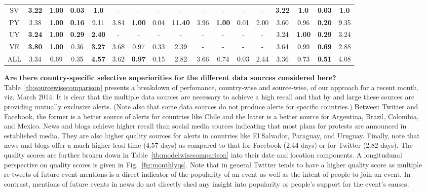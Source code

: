 \begin{table*}[tb!]
\begin{tabular}{|*{17}{c|}}
        SV &{\bf3.22}&{\bf1.00}&{\bf0.03}&{\bf1.0}&-&-&-&-&-&-&-&-&{\bf3.22}&{\bf1.0}&{\bf0.03}&{\bf1.0}\\
        PY &3.38&{\bf1.00}&{\bf0.16}&9.11&3.84&{\bf1.00}&0.04&{\bf11.40}&3.96&{\bf1.00}&0.01&2.00&3.60&0.96&{\bf0.20}&9.35\\
        UY &{\bf3.24}&{\bf1.00}&{\bf0.29}&{\bf2.40}&-&-&-&-&-&-&-&-&3.24&{\bf1.00}&{\bf0.29}&3.24\\
        VE &{\bf3.80}&{\bf1.00}&0.36&{\bf3.27}&3.68&0.97&0.33&2.39&-&-&-&-&3.64&0.99&{\bf0.69}&2.88\\
        ALL &3.34&0.69&0.35&{\bf4.57}&3.62&{\bf0.97}&0.15&2.82&3.66&0.74&0.03&2.44&3.36&0.73&{\bf0.51}&4.08\\
        \hline
    \end{tabular}
\end{table*}

\noindent
{\bf Are there country-specific selective superiorities for the different data sources considered here?}
Table~\ref{tb:sourcewisecomparison} presents a breakdown of perfomance, country-wise and source-wise, of 
our approach for a recent month, viz. March 2014.
It is clear that the multiple data sources are necessary to achieve a high recall and that by and large
these sources are providing mutually exclusive alerts. (Note also that some data sources do not produce alerts for specific
countries.) Between Twitter and Facebook, the former is a better
source of alerts for countries like Chile and the latter is a better source for Argentina, Brazil, Colombia, and Mexico.
News and blogs achieve higher recall than social media sources indicating that most plans for protests are announced
in established media. They are also
higher quality sources for alerts in countries like El Salvador, Paraguay, and Uruguay.
Finally, note that news and blogs offer a much higher lead time (4.57 days) 
as compared to that for Facebook (2.44 days) or for Twitter (2.82 days). The quality scores are
further broken down in Table~\ref{tb:modelwisecomparison} into their date and location components.
A longitudunal perspective on quality scores is
given in Fig.~\ref{fig:monthlyqs}. Note that in general Twitter tends to have a higher quality score
as multiple re-tweets of future event mentions is a direct indicator of the popularity of an event as 
well as the intent of people to join an event. 
In contrast, mentions of future events in news do not directly shed any insight into popularity or people's
support for the event's causes.\\

